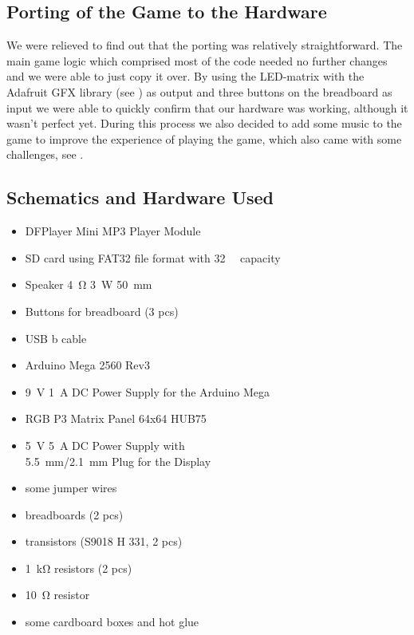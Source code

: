\documentclass[10pt, a4paper]{article}
\begin{document}
\subsection*{Porting of the Game to the Hardware}
We were relieved to find out that the porting was relatively straightforward. The main game logic which comprised most of the code needed no further changes and we were able to just copy it over. By using the LED-matrix with the Adafruit GFX library (see ) as output and three buttons on the breadboard as input we were able to quickly confirm that our hardware was working, although it wasn't perfect yet. During this process we also decided to add some music to the game to improve the experience of playing the game, which also came with some challenges, see .

\subsection*{Schematics and Hardware Used}
\begin{multicols}{2}
\begin{itemize}
    \item DFPlayer Mini MP3 Player Module
    \item SD card using FAT32 file format with \SI{32}{\giga\byte} capacity
    \item Speaker \SI{4}{\ohm} \SI{3}{\watt} \SI{50}{\milli\meter}
    \item Buttons for breadboard (3 pcs)
    \item USB b cable
    \item Arduino Mega 2560 Rev3
    \item \SI{9}{\volt} \SI{1}{\ampere} DC Power Supply for the Arduino Mega
    \item RGB P3 Matrix Panel 64x64 HUB75
    \item \SI{5}{\volt} \SI{5}{\ampere} DC Power Supply with \\ \SI{5.5}{\milli\meter}/\SI{2.1}{\milli\meter} Plug for the Display
    \item some jumper wires
    \item breadboards (2 pcs)
    \item transistors (S9018 H 331, 2 pcs)
    \item \SI{1}{\kilo\ohm} resistors (2 pcs)
    \item \SI{10}{\ohm} resistor
    \item some cardboard boxes and hot glue
\end{itemize}
\end{multicols}
\end{document}
